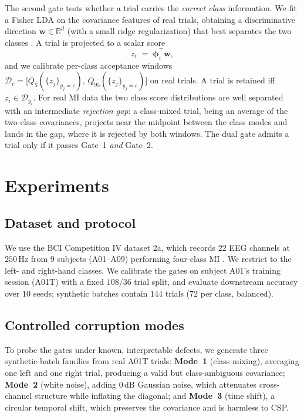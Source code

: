 \documentclass[conference]{IEEEtran}
\newcommand{\R}{\mathbb{R}}
\begin{document}
The second gate tests whether a trial carries the \emph{correct class}
information. We fit a Fisher LDA on the covariance features of real trials,
obtaining a discriminative direction $\mathbf{w}\in\R^{d}$ (with a small ridge
regularization) that best separates the two classes
\cite{fisher1936use}. A trial is projected to a scalar score
\begin{equation}
  z_i \;=\; \boldsymbol{\phi}_i^{\top}\mathbf{w},
  \label{eq:score}
\end{equation}
and we calibrate per-class acceptance windows
$\mathcal{D}_c=\big[Q_5(\{z_j\}_{y_j=c}),\,Q_{95}(\{z_j\}_{y_j=c})\big]$ on
real trials. A trial is retained iff $z_i\in\mathcal{D}_{y_i}$.
For real MI data the two class score distributions are well separated with an
intermediate \emph{rejection gap}: a class-mixed trial, being an average of the
two class covariances, projects near the midpoint between the class modes and
lands in the gap, where it is rejected by both windows. The dual gate admits a
trial only if it passes Gate~1 \emph{and} Gate~2.

\section{Experiments}
\label{sec:experiments}

\subsection{Dataset and protocol}
\label{sec:data}

We use the BCI Competition IV dataset 2a, which records $22$ EEG channels at
$250$\,Hz from $9$ subjects (A01--A09) performing four-class MI
\cite{tangermann2012review,brunner2008bci}. We restrict to the left- and
right-hand classes. We calibrate the gates on subject A01's training session
(A01T) with a fixed $108/36$ trial split, and evaluate downstream accuracy over
$10$ seeds; synthetic batches contain $144$ trials ($72$ per class,
balanced).

\subsection{Controlled corruption modes}
\label{sec:modes}

To probe the gates under known, interpretable defects, we generate three
synthetic-batch families from real A01T trials: \textbf{Mode~1} (class
mixing), averaging one left and one right trial, producing a valid but
class-ambiguous covariance; \textbf{Mode~2} (white noise), adding $0$\,dB
Gaussian noise, which attenuates cross-channel structure while inflating the
diagonal; and \textbf{Mode~3} (time shift), a circular temporal shift, which
preserves the covariance and is harmless to CSP.
\end{document}

